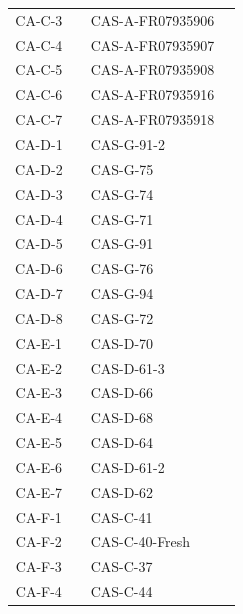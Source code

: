 \begin{table}[!ht]
\begin{tabular}{c|c|l|c}
CA-C-3 &  \cellcolor{white} &CAS-A-FR07935906 & \cellcolor{green!9} \\ 
CA-C-4 &  \cellcolor{white} &CAS-A-FR07935907 & \cellcolor{green!9} \\ 
CA-C-5 &  \cellcolor{white} &CAS-A-FR07935908 & \cellcolor{green!9} \\ 
CA-C-6 &  \cellcolor{white} &CAS-A-FR07935916 & \cellcolor{green!9} \\ 
CA-C-7 &  \cellcolor{white} &CAS-A-FR07935918 & \cellcolor{green!9}\multirow{-7}{*}{WGS} \\ 
\hhline{-|~|-|-}
CA-D-1 &  \cellcolor{white} &CAS-G-91-2 & \cellcolor{blue!9}\\ 
CA-D-2 &  \cellcolor{white} &CAS-G-75 & \cellcolor{blue!9} \\ 
CA-D-3 &  \cellcolor{white} &CAS-G-74 & \cellcolor{blue!9} \\ 
CA-D-4 &  \cellcolor{white} &CAS-G-71 &  \cellcolor{blue!9}\\ 
CA-D-5 &  \cellcolor{white} &CAS-G-91 &  \cellcolor{blue!9}\\ 
CA-D-6 &  \cellcolor{white} &CAS-G-76 & \cellcolor{blue!9} \\ 
CA-D-7 &  \cellcolor{white} &CAS-G-94 & \cellcolor{blue!9} \\ 
CA-D-8 &  \cellcolor{white} &CAS-G-72 & \cellcolor{blue!9}\multirow{-8}{*}{WES}\\ 
\hhline{-|~|-|-}
CA-E-1 &  \cellcolor{white} &CAS-D-70 & \cellcolor{blue!9}\\ 
CA-E-2 &  \cellcolor{white} &CAS-D-61-3 & \cellcolor{blue!9} \\ 
CA-E-3 &  \cellcolor{white} &CAS-D-66 & \cellcolor{blue!9} \\ 
CA-E-4 &  \cellcolor{white} &CAS-D-68 & \cellcolor{blue!9} \\ 
CA-E-5 &  \cellcolor{white} &CAS-D-64 &  \cellcolor{blue!9}\\ 
CA-E-6 &  \cellcolor{white} &CAS-D-61-2 &  \cellcolor{blue!9}\\ 
CA-E-7 &  \cellcolor{white} &CAS-D-62 & \cellcolor{blue!9} \multirow{-7}{*}{WES}\\ 
\hhline{-|~|-|-}
CA-F-1 &  \cellcolor{white} &CAS-C-41 & \cellcolor{blue!9}\\ 
CA-F-2 &  \cellcolor{white} &CAS-C-40-Fresh & \cellcolor{blue!9} \\ 
CA-F-3 &  \cellcolor{white} &CAS-C-37 & \cellcolor{blue!9} \\ 
CA-F-4 &  \cellcolor{white} &CAS-C-44 & \cellcolor{blue!9} \\ 

\end{tabular}
\end{table}
